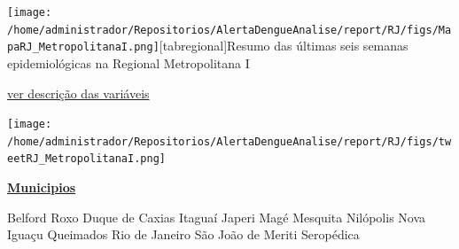 \documentclass[10pt]{article} %
\begin{document}

\begin{minipage}[t]{.66\linewidth}\hypertarget{regional}{}\texttt{[image: /home/administrador/Repositorios/AlertaDengueAnalise/report/RJ/figs/MapaRJ\_MetropolitanaI.png]}[tabregional]{Resumo das últimas seis semanas epidemiológicas na Regional Metropolitana I }\begin{center}\end{center}\small{\hyperlink{vartab}{ver descrição das variáveis}}\begin{center}\texttt{[image: /home/administrador/Repositorios/AlertaDengueAnalise/report/RJ/figs/tweetRJ\_MetropolitanaI.png]}\end{center}\end{minipage}\hfill\begin{minipage}[t]{.30\linewidth}\begin{mdframed}[style=sidebar,frametitle={}]\textbf{\hyperlink{municips}{Municipios}}\begin{itemize}\gsquare Belford Roxo 
\ysquare Duque de Caxias 
\gsquare Itaguaí 
\gsquare Japeri 
\gsquare Magé 
\gsquare Mesquita 
\gsquare Nilópolis 
\gsquare Nova Iguaçu 
\gsquare Queimados 
\ysquare Rio de Janeiro 
\gsquare São João de Meriti 
\ysquare Seropédica \end{itemize}\BackToContents\end{mdframed}\hfill\end{minipage}\newpage
\end{document}
